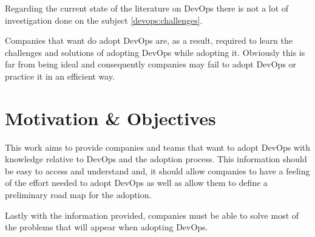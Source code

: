 		Regarding the current state of the literature on DevOps there is not a lot of investigation done on the subject \ref{devops:challenges}. 

		Companies that want do adopt DevOps are, as a result, required to learn the challenges and solutions of adopting DevOps while adopting it. Obviously this is far from being ideal and consequently companies may fail to adopt DevOps or practice it in an efficient way.

		   
	\section{Motivation \& Objectives} \label{chap:introduction:sec:motivation}

	    This work aims to provide companies and teams that want to adopt DevOps with knowledge relative to DevOps and the adoption process. This information should be easy to access and understand and, it should allow companies to have a feeling of the effort needed to adopt DevOps as well as allow them to define a preliminary road map for the adoption. 
	    
	    Lastly with the information provided, companies must be able to solve most of the problems that will appear when adopting DevOps.